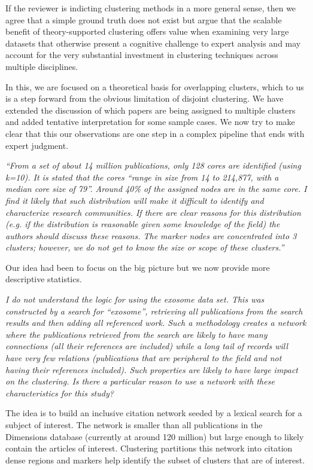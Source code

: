 \documentclass[11pt, oneside]{article}   	%
\begin{document}
If the reviewer is indicting clustering methods in a more general sense, then we agree that a simple ground truth does not exist but argue that the scalable benefit of theory-supported clustering offers
value when examining very large datasets that otherwise present a cognitive challenge to expert analysis and may account for the very substantial investment in clustering techniques across multiple disciplines. 

In this, we are focused on a theoretical basis for overlapping clusters, which to us is a step forward from the obvious limitation of disjoint clustering. We have extended the discussion of which papers are being assigned to multiple clusters and added tentative interpretation for some sample cases. We now try to make clear that this our observations are one step in a complex pipeline that ends with expert judgment.

\emph{``From a set of about 14 million publications, only 128 cores are identified (using k=10). It is stated that the cores “range in size from 14 to 214,877, with a median core size of 79”. Around 40\% of the assigned nodes are in the same core. I find it likely that such distribution will make it difficult to identify and characterize research communities. If there are clear reasons for this distribution (e.g. if the distribution is reasonable given some knowledge of the field) the authors should discuss these reasons. The marker nodes are concentrated into 3 clusters; however, we do not get to know the size or scope of these clusters.''}

Our idea had been to focus on the big picture but we now provide more descriptive statistics. 

\emph{I do not understand the logic for using the exosome data set. This was constructed by a search for “exosome”, retrieving all publications from the search results and then adding all referenced work. Such a methodology creates a network where the publications retrieved from the search are likely to have many connections (all their references are included) while a long tail of records will have very few relations (publications that are peripheral to the field and not having their references included). Such properties are likely to have large impact on the clustering. Is there a particular reason to use a network with these characteristics for this study?}

The idea is to build an inclusive citation network seeded by a lexical search for a subject of interest. The network is smaller than all publications in the Dimensions database (currently at around 120 million) but 
large enough to likely contain the articles of interest. Clustering partitions this network into citation dense regions and markers help identify the subset of clusters that are of interest. 
\end{document}
